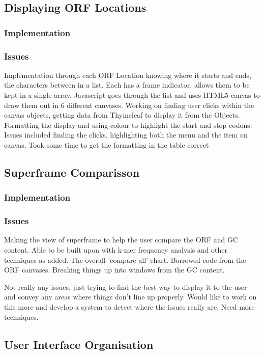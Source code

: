 \subsection{Displaying ORF Locations}
\subsubsection{Implementation}
\subsubsection{Issues}
Implementation through each ORF Location knowing where it starts and ends, the characters between in a list. Each has a frame indicator, allows them to be kept in a single array. Javascript goes through the list and uses HTML5 canvas to draw them out in 6 different canvases. Working on finding user clicks within the canvas objects, getting data from Thymeleaf to display it from the Objects. Formatting the display and using colour to highlight the start and stop codons.
Issues included finding the clicks, highlighting both the menu and the item on canvas. Took some time to get the formatting in the table correct

\subsection{Superframe Comparisson}
\subsubsection{Implementation}
\subsubsection{Issues}
Making the view of superframe to help the user compare the ORF and GC content. Able to be built upon with k-mer frequency analysis and other techniques as added. The overall 'compare all' chart. Borrowed code from the ORF canvases. Breaking things up into windows from the GC content.

Not really any issues, just trying to find the best way to display it to the user and convey any areas where things don't line up properly. Would like to work on this more and develop a system to detect where the issues really are. Need more techniques.

\subsection{User Interface Organisation}
